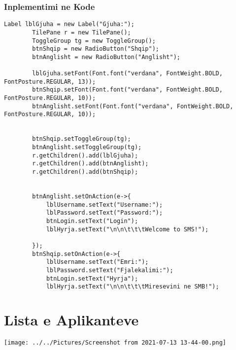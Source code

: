 \documentclass[a4paper]{article}
\begin{document}
\subsubsection{Inplementimi ne Kode}
\begin{lstlisting}
Label lblGjuha = new Label("Gjuha:");
		TilePane r = new TilePane(); 
        ToggleGroup tg = new ToggleGroup(); 
		btnShqip = new RadioButton("Shqip");
		btnAnglisht = new RadioButton("Anglisht");
		
	    lblGjuha.setFont(Font.font("verdana", FontWeight.BOLD, FontPosture.REGULAR, 13)); 
	    btnShqip.setFont(Font.font("verdana", FontWeight.BOLD, FontPosture.REGULAR, 10)); 
	    btnAnglisht.setFont(Font.font("verdana", FontWeight.BOLD, FontPosture.REGULAR, 10)); 


		btnShqip.setToggleGroup(tg);
		btnAnglisht.setToggleGroup(tg);
		r.getChildren().add(lblGjuha);
		r.getChildren().add(btnAnglisht);
		r.getChildren().add(btnShqip);

		
		btnAnglisht.setOnAction(e->{
			lblUsername.setText("Username:");
			lblPassword.setText("Password:");
			btnLogin.setText("Login");
			lblHyrja.setText("\n\n\t\t\tWelcome to SMS!");

		});
		btnShqip.setOnAction(e->{
			lblUsername.setText("Emri:");
			lblPassword.setText("Fjalekalimi:");
			btnLogin.setText("Hyrja");
			lblHyrja.setText("\n\n\t\t\tMiresevini ne SMB!");
\end{lstlisting}
\newpage
\section{Lista e Aplikanteve}
\begin{center}
\texttt{[image: ../../Pictures/Screenshot from 2021-07-13 13-44-00.png]} 
\end{center}
\end{document}
